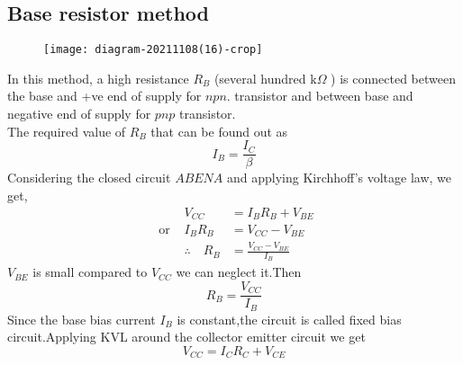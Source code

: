    \subsection{Base resistor method}
   \begin{figure}[H]
   	\centering
   	\texttt{[image: diagram-20211108(16)-crop]}
   	\caption{}
   	\label{}
   \end{figure}
   In this method, a high resistance $R_{B}$ (several hundred $\mathrm{k} \Omega$ ) is connected between the base and +ve end of supply for $n p n$. transistor  and between base and negative end of supply for $p n p$ transistor.\\
   The required value of $R_B$  that can be found out as \\
   $$
   I_{B}=\frac{I_{C}}{\beta}
   $$
   Considering the closed circuit $A B E N A$ and applying Kirchhoff's voltage law, we get,
   $$
   \begin{aligned}
   & V_{C C} &=I_{B} R_{B}+V_{B E} \\
   \text { or } & I_{B} R_{B} &=V_{C C}-V_{B E} \\
   & \therefore \quad R_{B} &=\frac{V_{C C}-V_{B E}}{I_{B}}
   \end{aligned}
   $$
   $V_{BE}$ is small compared to $V_{CC}$  we can neglect it.Then\\
   $$R_B=\frac{V_{CC}}{I_B}$$
   Since the base bias current $I_B$ is constant,the circuit is called fixed bias circuit.Applying KVL around the collector emitter circuit we get
   $$V_{CC}=I_CR_C+V_{CE}$$
